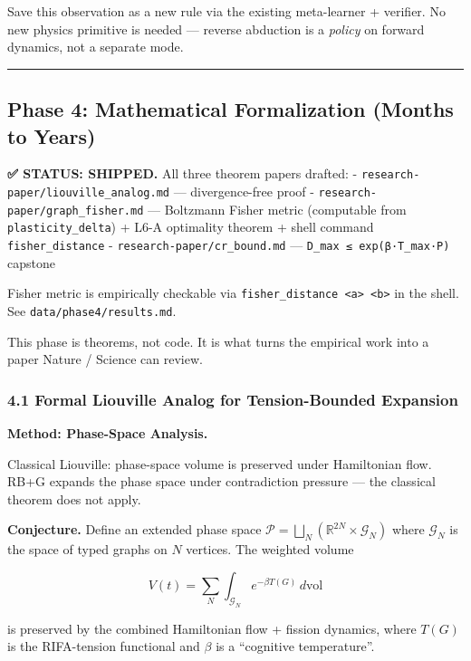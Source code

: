 \documentclass[
  11pt,
  a4paper,
]{article}
\begin{document}
Save this observation as a new rule via the existing meta-learner +
verifier. No new physics primitive is needed --- reverse abduction is a
\emph{policy} on forward dynamics, not a separate mode.

\begin{center}\rule{0.5\linewidth}{0.5pt}\end{center}

\subsection{Phase 4: Mathematical Formalization (Months to
Years)}\label{phase-4-mathematical-formalization-months-to-years}

\textbf{✅ STATUS: SHIPPED.} All three theorem papers drafted: -
\texttt{research-paper/liouville\_analog.md} --- divergence-free proof -
\texttt{research-paper/graph\_fisher.md} --- Boltzmann Fisher metric
(computable from \texttt{plasticity\_delta}) + L6-A optimality theorem +
shell command \texttt{fisher\_distance} -
\texttt{research-paper/cr\_bound.md} ---
\texttt{D\_max\ ≤\ exp(β·T\_max·P)} capstone

Fisher metric is empirically checkable via
\texttt{fisher\_distance\ \textless{}a\textgreater{}\ \textless{}b\textgreater{}}
in the shell. See \texttt{data/phase4/results.md}.

This phase is theorems, not code. It is what turns the empirical work
into a paper Nature / Science can review.

\subsubsection{4.1 Formal Liouville Analog for Tension-Bounded
Expansion}\label{formal-liouville-analog-for-tension-bounded-expansion}

\textbf{Method: Phase-Space Analysis.}

Classical Liouville: phase-space volume is preserved under Hamiltonian
flow. RB+G expands the phase space under contradiction pressure --- the
classical theorem does not apply.

\textbf{Conjecture.} Define an extended phase space
\(\mathcal{P} = \bigsqcup_N (\mathbb{R}^{2N} \times \mathcal{G}_N)\)
where \(\mathcal{G}_N\) is the space of typed graphs on \(N\) vertices.
The weighted volume

\[
V(t) = \sum_N \int_{\mathcal{G}_N} e^{-\beta T(G)} \, d\text{vol}
\]

is preserved by the combined Hamiltonian flow + fission dynamics, where
\(T(G)\) is the RIFA-tension functional and \(\beta\) is a ``cognitive
temperature''.
\end{document}
